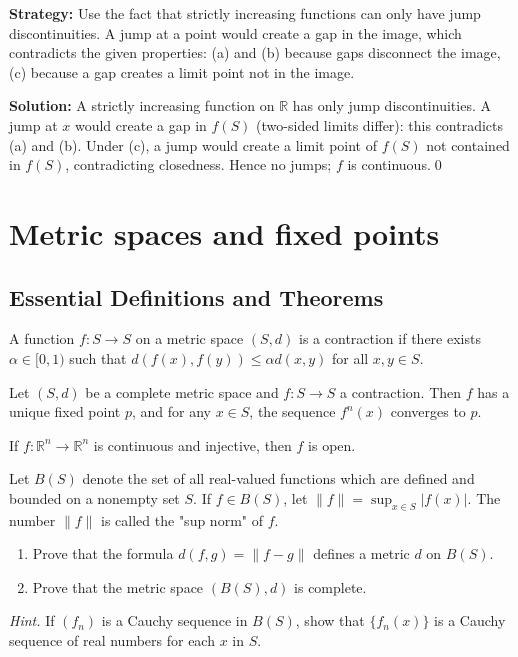 \noindent\textbf{Strategy:} Use the fact that strictly increasing functions can only have jump discontinuities. A jump at a point would create a gap in the image, which contradicts the given properties: (a) and (b) because gaps disconnect the image, (c) because a gap creates a limit point not in the image.

\bigskip\noindent\textbf{Solution:}
A strictly increasing function on $\mathbb{R}$ has only jump discontinuities. A jump at $x$ would create a gap in $f(S)$ (two-sided limits differ): this contradicts (a) and (b). Under (c), a jump would create a limit point of $f(S)$ not contained in $f(S)$, contradicting closedness. Hence no jumps; $f$ is continuous.\qed

\section{Metric spaces and fixed points}

\subsection*{Essential Definitions and Theorems}

\begin{definition}
A function $f: S \to S$ on a metric space $(S,d)$ is a contraction if there exists $\alpha \in [0,1)$ such that $d(f(x), f(y)) \leq \alpha d(x,y)$ for all $x,y \in S$.
\end{definition}

\begin{theorem}
Let $(S,d)$ be a complete metric space and $f: S \to S$ a contraction. Then $f$ has a unique fixed point $p$, and for any $x \in S$, the sequence $f^n(x)$ converges to $p$.
\end{theorem}

\begin{theorem}
If $f: \mathbb{R}^n \to \mathbb{R}^n$ is continuous and injective, then $f$ is open.
\end{theorem}



\begin{problembox}
Let $B(S)$ denote the set of all real-valued functions which are defined and bounded on a nonempty set $S$. If $f \in B(S)$, let $\|f\| = \sup_{x \in S} |f(x)|$. The number $\|f\|$ is called the "sup norm" of $f$.
\begin{enumerate}[label=(\alph*)]
\item Prove that the formula $d(f, g) = \|f - g\|$ defines a metric $d$ on $B(S)$.
\item Prove that the metric space $(B(S), d)$ is complete. 
\end{enumerate}
\textit{Hint.} If $(f_n)$ is a Cauchy sequence in $B(S)$, show that $\{f_n(x)\}$ is a Cauchy sequence of real numbers for each $x$ in $S$.
\end{problembox}

